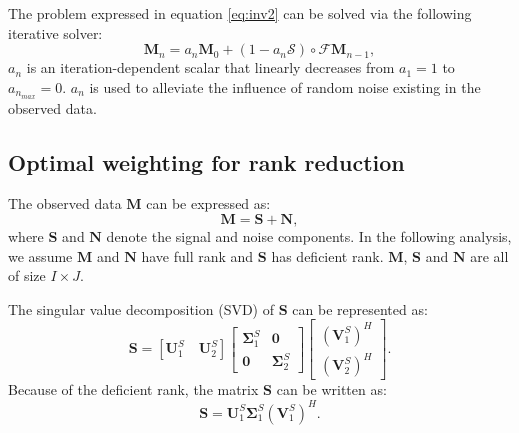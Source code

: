 The problem expressed in equation \ref{eq:inv2} can be solved via the following iterative solver:
\begin{equation}
\label{eq:iter}
\mathbf{M}_n=a_n \mathbf{M}_{0} + (1-a_n\mathcal{S})\circ \mathcal{F}\mathbf{M}_{n-1},
\end{equation}
$a_n$ is an iteration-dependent scalar that linearly decreases from $a_1=1$ to $a_{n_{max}}=0$. $a_n$ is used to alleviate the influence of random noise existing in the observed data. 

\subsection{Optimal weighting for rank reduction}
The observed data $\mathbf{M}$ can be expressed as:
\begin{equation}
\label{eq:msn}
\mathbf{M}=\mathbf{S}+\mathbf{N},
\end{equation}
where $\mathbf{S}$ and $\mathbf{N}$ denote the signal and noise components.  In the following analysis, we assume $\mathbf{M}$ and $\mathbf{N}$ have full rank and $\mathbf{S}$ has deficient rank. $\mathbf{M}$, $\mathbf{S}$ and $\mathbf{N}$ are all of size $I\times J$.

The singular value decomposition (SVD) of $\mathbf{S}$ can be represented as:
\begin{equation}
\label{eq:svds_a}
\mathbf{S} = [\mathbf{U}_1^{S}\quad \mathbf{U}_2^{S}]\left[\begin{array}{cc}
\boldsymbol{\Sigma}_1^{S} & \mathbf{0}\\
\mathbf{0} & \boldsymbol{\Sigma}_2^{S}
\end{array}
\right]\left[\begin{array}{c}
(\mathbf{V}_1^{S})^H\\
(\mathbf{V}_2^{S})^H
\end{array}
\right].
\end{equation}
Because of the deficient rank, the matrix $\mathbf{S}$ can be written as:
\begin{equation}
\label{eq:S_a}
\mathbf{S}=\mathbf{U}_1^S\boldsymbol{\Sigma}_1^S(\mathbf{V}_1^S)^H.
\end{equation}

